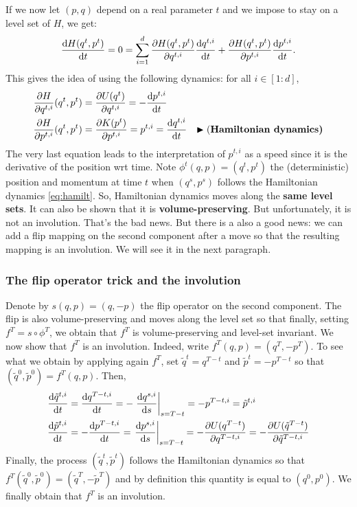 \documentclass[english,graybox,envcountchap,envcountsame,sectrefs,shortlabels]{svmono}
\theoremstyle{style}
\newcommand{\eqsp}{}
\begin{document}
If we now let $(p,q)$ depend on a real parameter $t$ and we impose to stay on a level set of $H$, we get:
$$
\frac{\rmd H(q^t,p^t)}{\rmd t}=0=\sum_{i=1}^d \frac{\partial H(q^t,p^t)}{\partial q^{t,i}} \frac{\rmd q^{t,i}}{\rmd t}+\frac{\partial H(q^t,p^t)}{\partial p^{t,i}} \frac{\rmd p^{t,i}}{\rmd t}\eqsp.
$$
This gives the idea of using the following dynamics: for all $i \in [1:d]$,
\begin{align}
\frac{\partial H}{\partial q^{t,i}}(q^t,p^t)&=\frac{\partial U(q^t)}{\partial q^{t,i}}=-\frac{\mathrm{d} p^{t,i}}{\mathrm{d} t} \nonumber\\
\frac{\partial H}{\partial p^{t,i}}(q^t,p^t)&=\frac{\partial K(p^t)}{\partial p^{t,i}}=p^{t,i}=\frac{\mathrm{d} q^{t,i}}{\mathrm{d} t} \quad {\blacktriangleright \mbox{(\bf Hamiltonian dynamics)}} \label{eq:hamilt}
\end{align}
The very last equation leads to the interpretation of $p^{t,i}$ as a speed since it is the derivative of the position wrt time.
Note $\phi^t(q,p)=(q^t,p^t)$ the (deterministic) position and momentum at time $t$ when $(q^s,p^s)$ follows the Hamiltonian dynamics \eqref{eq:hamilt}. So, Hamiltonian dynamics moves along the {\bf same level sets}. It can also be shown that it is {\bf volume-preserving}. But unfortunately, it is not an involution. That's the bad news. But there is a also a good news: we can add a flip mapping on the second component after a move so that the resulting mapping is an involution. We will see it in the next paragraph.

\subsubsection{The flip operator trick and the involution}
Denote by $s(q,p)=(q,-p)$ the flip operator on the second component. The flip is also volume-preserving and moves along the level set so that finally, setting $f^T=s \circ \phi^T$, we obtain that $f^T$ is volume-preserving and level-set invariant. We now show that $f^T$ is an involution. Indeed, write $f^T(q,p)=(q^T,-p^T)$. To see what we obtain by applying again $f^T$, set $\tilde q^t=q^{T-t}$ and $\tilde p^t=-p^{T-t}$ so that $(\tilde q^0,\tilde p^0)=f^T(q,p)$. Then,
\begin{align*}
\frac{\mathrm{d} \tilde q^{t,i}}{\mathrm{d} t}&=\frac{\mathrm{d} q^{T-t,i}}{\mathrm{d} t}=-\left. \frac{\mathrm{d} q^{s,i}}{\mathrm{d} s} \right|_{s=T-t}=-p^{T-t,i}=\tilde p^{t,i}\\
\frac{\mathrm{d} \tilde p^{t,i}}{\mathrm{d} t}&=-\frac{\mathrm{d} p^{T-t,i}}{\mathrm{d} t}= \left. \frac{\mathrm{d} p^{s,i}}{\mathrm{d} s} \right|_{s=T-t}=-\frac{\partial U(q^{T-t})}{\partial q^{T-t,i}}=-\frac{\partial U(\tilde q^{T-t})}{\partial \tilde q^{T-t,i}}
\end{align*}
Finally, the process $(\tilde q^t,\tilde p^t)$ follows the Hamiltonian dynamics so that $f^T(\tilde q^0,\tilde p^0)=(\tilde q^T,-\tilde p^T)$ and by definition this quantity is equal to $(q^0,p^0)$. We finally obtain that $f^T$ is an involution.
\end{document}
